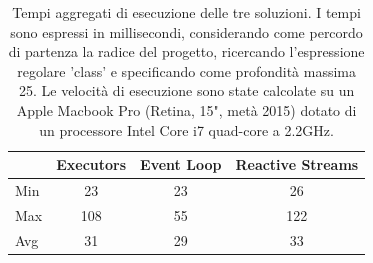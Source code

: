 \documentclass[a4paper]{article}
\begin{document}
\begin{table}[H]

\centering

\label{my-label}

\begin{tabular}{l|ccc}
\hline
    & Executors & Event Loop & Reactive Streams \\ \hline
Min & 23        & 23         & 26               \\
Max & 108       & 55         & 122               \\
Avg & 31        & 29         & 33               \\ \hline
\end{tabular}

\caption{Tempi aggregati di esecuzione delle tre soluzioni. I tempi sono espressi in millisecondi, considerando come percordo di partenza la radice del progetto, ricercando l'espressione regolare 'class' e specificando come profondità massima 25.
Le velocità di esecuzione sono state calcolate su un Apple Macbook Pro (Retina, 15", metà 2015) dotato di un processore Intel Core i7 quad-core a 2.2GHz.}

\label{Tabella speedup del sistema}

\end{table}

\end{document}
